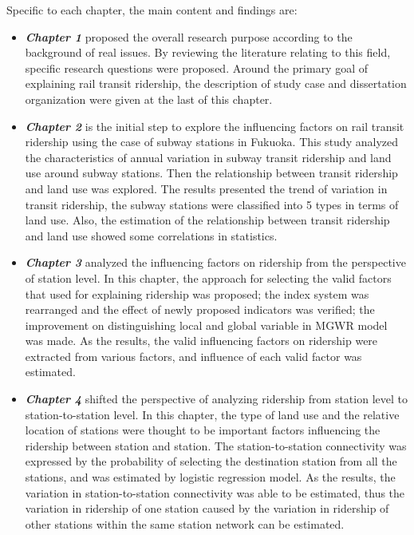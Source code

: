 Specific to each chapter, the main content and findings are:
\begin{itemize}
	\item \emph{\textbf{Chapter 1}} proposed the overall research purpose according to the background of real issues. By reviewing the literature relating to this field, specific research questions were proposed. Around the primary goal of explaining rail transit ridership, the description of study case and dissertation organization were given at the last of this chapter.
	
	\item \emph{\textbf{Chapter 2}} is the initial step to explore the influencing factors on rail transit ridership using the case of subway stations in Fukuoka. This study analyzed the characteristics of annual variation in subway transit ridership and land use around subway stations. Then the relationship between transit ridership and land use was explored. The results presented the trend of variation in transit ridership, the subway stations were classified into 5 types in terms of land use. Also, the estimation of the relationship between transit ridership and land use showed some correlations in statistics.
	
	\item \emph{\textbf{Chapter 3}} analyzed the influencing factors on ridership from the perspective of station level. In this chapter, the approach for selecting the valid factors that used for explaining ridership was proposed; the index system was rearranged and the effect of newly proposed indicators was verified; the improvement on distinguishing local and global variable in MGWR model was made. As the results, the valid influencing factors on ridership were extracted from various factors, and influence of each valid factor was estimated.
	
	\item \emph{\textbf{Chapter 4}} shifted the perspective of analyzing ridership from station level to station-to-station level. In this chapter, the type of land use and the relative location of stations were thought to be important factors influencing the ridership between station and station. The station-to-station connectivity was expressed by the probability of selecting the destination station from all the stations, and was estimated by logistic regression model. As the results, the variation in station-to-station connectivity was able to be estimated, thus the variation in ridership of one station caused by the variation in ridership of other stations within the same station network can be estimated.
	

\end{itemize}
